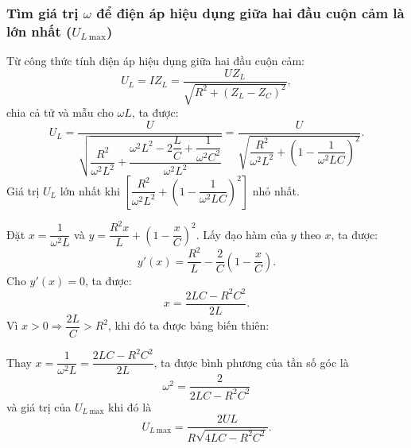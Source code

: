 \subsubsection{Tìm giá trị $\omega$ để điện áp hiệu dụng giữa hai đầu cuộn cảm là lớn nhất ($U_{L\ \text{max}}$)}

Từ công thức tính điện áp hiệu dụng giữa hai đầu cuộn cảm:
\begin{equation*}
	U_L=IZ_L=\dfrac{UZ_L}{\sqrt{R^2+(Z_L-Z_C)^2}},
\end{equation*}
chia cả tử và mẫu cho $\omega L$, ta được:
\begin{equation*}
	U_L=\dfrac{U}{\sqrt{\dfrac{R^2}{\omega^2 L^2}+\dfrac{\omega^2 L^2 - 2 \dfrac{L}{C}+\dfrac{1}{\omega^2 C^2}}{\omega^2 L^2}}}=\dfrac{U}{\sqrt{\dfrac{R^2}{\omega^2 L^2}+\left(1-\dfrac{1}{\omega^2 LC}\right)^2}}.
\end{equation*}
Giá trị $U_L$ lớn nhất khi $\left[\dfrac{R^2}{\omega^2 L^2}+\left(1-\dfrac{1}{\omega^2 LC}\right)^2\right]$ nhỏ nhất.

Đặt $x=\dfrac{1}{\omega^2 L}$ và $y=\dfrac{R^2x}{L}+\left(1-\dfrac{x}{C}\right)^2$.
Lấy đạo hàm của $y$ theo $x$, ta được:
\begin{equation*}
	y'(x)=\dfrac{R^2}{L}-\dfrac{2}{C}\left(1-\dfrac{x}{C}\right).
\end{equation*}
Cho $y'(x)=0$, ta được:
\begin{equation*}
	x=\dfrac{2LC-R^2C^2}{2L}.
\end{equation*}
Vì $x>0 \Rightarrow \dfrac{2L}{C}>R^2$, khi đó ta được bảng biến thiên:
\begin{center}
\end{center}
Thay $x=\dfrac{1}{\omega^2L} = \dfrac{2LC-R^2C^2}{2L}$, ta được bình phương của tần số góc là
\begin{equation*}
	\omega^2 = \dfrac{2}{2LC-R^2C^2}
\end{equation*}
và giá trị của $U_{L\ \text {max}} $ khi đó là
\begin{equation*}
	U_{L\ \text{max}}=\dfrac{2UL}{R\sqrt{4LC-R^2C^2}}.
\end{equation*}
